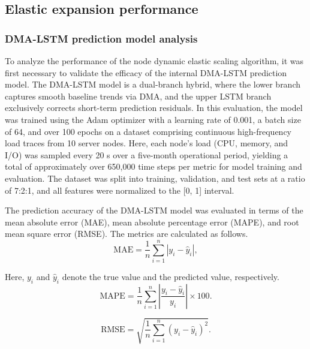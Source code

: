 \documentclass[twoside,twocolumn]{article}
\begin{document}
\subsection{Elastic expansion performance}

\subsubsection{DMA-LSTM prediction model analysis}

To analyze the performance of the node dynamic elastic scaling algorithm, it was first necessary to validate the efficacy of the internal DMA-LSTM prediction model. The DMA-LSTM model is a dual-branch hybrid, where the lower branch captures smooth baseline trends via DMA, and the upper LSTM branch exclusively corrects short-term prediction residuals. In this evaluation, the model was trained using the Adam optimizer with a learning rate of 0.001, a batch size of 64, and over 100 epochs on a dataset comprising continuous high-frequency load traces from 10 server nodes. Here, each node's load (CPU, memory, and I/O) was sampled every 20 s over a five-month operational period, yielding a total of approximately over 650,000 time steps per metric for model training and evaluation. The dataset was split into training, validation, and test sets at a ratio of 7:2:1, and all features were normalized to the [0, 1] interval.

The prediction accuracy of the DMA-LSTM model was evaluated in terms of the mean absolute error (MAE), mean absolute percentage error (MAPE), and root mean square error (RMSE). The metrics are calculated as follows.
\begin{equation}
\mathrm{MAE} = \frac{1}{n} \sum_{i=1}^{n} \left| y_i - \hat{y}_i \right|,
\end{equation}

Here, $y_i$ and $\hat{y}_i$ denote the true value and the predicted value, respectively.
\begin{equation}
\mathrm{MAPE} = \frac{1}{n} \sum_{i=1}^{n} \left| \frac{y_i - \hat{y}_i}{y_i} \right| \times 100.
\label{eq:S14}
\end{equation}

\begin{equation}
\mathrm{RMSE} = \sqrt{\frac{1}{n} \sum_{i=1}^{n} \left( y_i - \hat{y}_i \right)^2}.
\end{equation}
\end{document}
